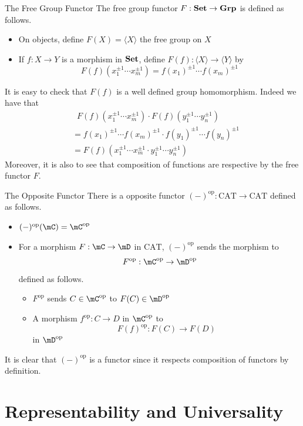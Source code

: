 \documentclass[a4paper]{article}
\begin{document}
\begin{defn}{The Free Group Functor}{} The free group functor $F:\bold{Set}\to\bold{Grp}$ is defined as follows. 
\begin{itemize}
\item On objects, define $F(X)=\langle X\rangle$ the free group on $X$
\item If $f:X\to Y$ is a morphism in $\bold{Set}$, define $F(f):\langle X\rangle\to\langle Y\rangle$ by $$F(f)(x_1^{\pm1}\cdots x_m^{\pm1})=f(x_1)^{\pm1}\cdots f(x_m)^{\pm1}$$
\end{itemize}
\end{defn}

It is easy to check that $F(f)$ is a well defined group homomorphism. Indeed we have that 
\begin{align*}
&\;\;F(f)(x_1^{\pm1}\cdots x_m^{\pm1})\cdot F(f)(y_1^{\pm1}\cdots y_n^{\pm1})\\
&=f(x_1)^{\pm1}\cdots f(x_m)^{\pm1}\cdot f(y_1)^{\pm1}\cdots f(y_n)^{\pm1}\\
&=F(f)(x_1^{\pm1}\cdots x_m^{\pm1}\cdot y_1^{\pm1}\cdots y_n^{\pm1})
\end{align*}
Moreover, it is also to see that composition of functions are respective by the free functor $F$. 

\begin{defn}{The Opposite Functor}{} There is a opposite functor $(-)^\text{op}:\text{CAT}\to\text{CAT}$ defined as follows. 
\begin{itemize}
\item $(-)^\text{op}(\mC)=\mC^\text{op}$
\item For a morphism $F:\mC\to\mD$ in $\text{CAT}$, $(-)^\text{op}$ sends the morphism to $$F^\text{op}:\mC^\text{op}\to\mD^\text{op}$$ defined as follows. 
\begin{itemize}
\item $F^\text{op}$ sends $C\in\mC^\text{op}$ to $F(C)\in\mD^\text{op}$
\item A morphism $f^\text{op}:C\to D$ in $\mC^\text{op}$ to $$F(f)^\text{op}:F(C)\to F(D)$$ in $\mD^\text{op}$
\end{itemize}
\end{itemize}
\end{defn}

It is clear that $(-)^\text{op}$ is a functor since it respects composition of functors by definition. 

\pagebreak
\section{Representability and Universality}
\end{document}
